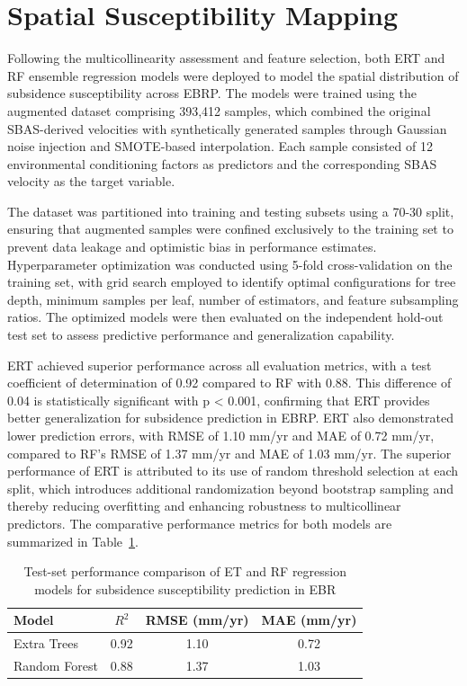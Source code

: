 \documentclass[oneside,doublespacing,flushright]{lsuthesis}
\begin{document}
\section{Spatial Susceptibility Mapping}

Following the multicollinearity assessment and feature selection, both ERT and RF ensemble regression models were deployed to model the spatial distribution of subsidence susceptibility across EBRP. The models were trained using the augmented dataset comprising 393,412 samples, which combined the original SBAS-derived velocities with synthetically generated samples through Gaussian noise injection and SMOTE-based interpolation. Each sample consisted of 12 environmental conditioning factors as predictors and the corresponding SBAS velocity as the target variable.

The dataset was partitioned into training and testing subsets using a 70-30 split, ensuring that augmented samples were confined exclusively to the training set to prevent data leakage and optimistic bias in performance estimates. Hyperparameter optimization was conducted using 5-fold cross-validation on the training set, with grid search employed to identify optimal configurations for tree depth, minimum samples per leaf, number of estimators, and feature subsampling ratios. The optimized models were then evaluated on the independent hold-out test set to assess predictive performance and generalization capability.

ERT achieved superior performance across all evaluation metrics, with a test coefficient of determination of 0.92 compared to RF with 0.88. This difference of 0.04 is statistically significant with p < 0.001, confirming that ERT provides better generalization for subsidence prediction in EBRP. ERT also demonstrated lower prediction errors, with RMSE of 1.10 mm/yr and MAE of 0.72 mm/yr, compared to RF's RMSE of 1.37 mm/yr and MAE of 1.03 mm/yr. The superior performance of ERT is attributed to its use of random threshold selection at each split, which introduces additional randomization 
beyond bootstrap sampling and thereby reducing overfitting and enhancing robustness to multicollinear predictors. The comparative performance metrics for both models are summarized in Table~\ref{tab:model_performance}.

\begin{table}[!t]
\centering
\caption{Test-set performance comparison of ET and RF regression models for subsidence susceptibility prediction in EBR}
\label{tab:model_performance}
\begin{tabular}{lccc}
\hline
\textbf{Model} & \textbf{$R^2$} & \textbf{RMSE (mm/yr)} & \textbf{MAE (mm/yr)} \\
\hline
Extra Trees    & 0.92 & 1.10 & 0.72 \\
Random Forest  & 0.88 & 1.37 & 1.03 \\
\hline
\end{tabular}
\end{table}
\end{document}

